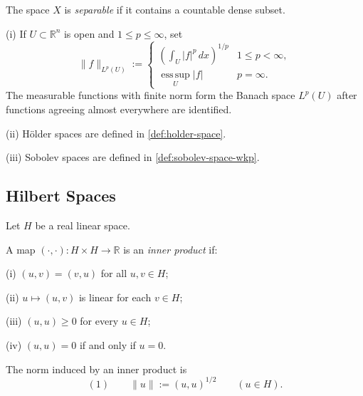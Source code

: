 \begin{definition}
\label{def:separable-space}
The space $X$ is \textit{separable} if it contains a countable dense subset.
\end{definition}

\begin{example}
\label{ex:banach-space-examples-lp-holder-sobolev}

(i) If $U\subset\mathbb R^n$ is open and $1\leq p\leq\infty$, set
\[
\|f\|_{L^p(U)}:=
\begin{cases}
\left(\int_U|f|^p\,dx\right)^{1/p} & 1\leq p<\infty,\\
\operatorname*{ess\,sup}_U|f| & p=\infty.
\end{cases}
\]
The measurable functions with finite norm form the Banach space $L^p(U)$ after functions agreeing almost everywhere are identified.

(ii) H\"older spaces are defined in \cref{def:holder-space}.

(iii) Sobolev spaces are defined in \cref{def:sobolev-space-wkp}.
\end{example}

\subsection{Hilbert Spaces}
\label{sec:hilbert-spaces}

Let $H$ be a real linear space.

\begin{definition}
\label{def:inner-product}
A map $(\cdot,\cdot):H\times H\to\mathbb R$ is an \textit{inner product} if:

(i) $(u,v)=(v,u)$ for all $u,v\in H$;

(ii) $u\mapsto(u,v)$ is linear for each $v\in H$;

(iii) $(u,u)\geq0$ for every $u\in H$;

(iv) $(u,u)=0$ if and only if $u=0$.
\end{definition}

\begin{definition}
\label{def:norm-from-inner-product}

The norm induced by an inner product is
\[
(1)\qquad \|u\|:=(u,u)^{1/2}\qquad(u\in H).
\]
\end{definition}

